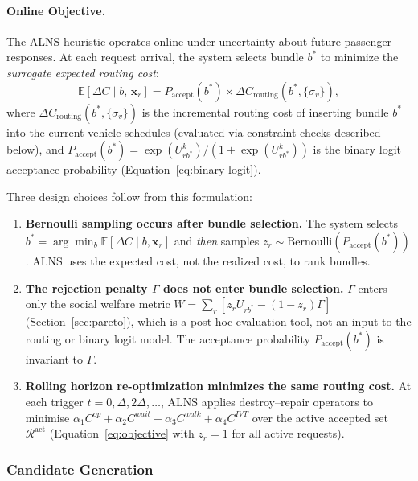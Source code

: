 \paragraph{Online Objective.}
The ALNS heuristic operates online under uncertainty about future passenger responses.
At each request arrival, the system selects bundle $b^*$ to minimize the
\emph{surrogate expected routing cost}:
\begin{equation}\label{eq:alns-objective}
  \mathbb{E}[\Delta C \mid b,\, \mathbf{x}_r]
    = P_{\text{accept}}(b^*) \times \Delta C_{\text{routing}}(b^*, \{\sigma_v\}),
\end{equation}
where $\Delta C_{\text{routing}}(b^*, \{\sigma_v\})$ is the incremental routing cost
of inserting bundle $b^*$ into the current vehicle schedules
(evaluated via constraint checks described below), and
$P_{\text{accept}}(b^*) = \exp(U_{rb^*}^k) / (1 + \exp(U_{rb^*}^k))$
is the binary logit acceptance probability (Equation~\ref{eq:binary-logit}).

Three design choices follow from this formulation:
\begin{enumerate}
  \item \textbf{Bernoulli sampling occurs after bundle selection.}
        The system selects $b^* = \arg\min_b \mathbb{E}[\Delta C \mid b, \mathbf{x}_r]$
        and \emph{then} samples $z_r \sim \mathrm{Bernoulli}(P_{\text{accept}}(b^*))$.
        ALNS uses the expected cost, not the realized cost, to rank bundles.
  \item \textbf{The rejection penalty $\Gamma$ does not enter bundle selection.}
        $\Gamma$ enters only the social welfare metric
        $W = \sum_r [z_r U_{rb^*} - (1-z_r)\Gamma]$ (Section~\ref{sec:pareto}),
        which is a post-hoc evaluation tool, not an input to the routing or
        binary logit model. The acceptance probability $P_{\text{accept}}(b^*)$
        is invariant to $\Gamma$.
  \item \textbf{Rolling horizon re-optimization minimizes the same routing cost.}
        At each trigger $t = 0, \Delta, 2\Delta, \ldots$, ALNS applies
        destroy--repair operators to minimise
        $\alpha_1 C^{op} + \alpha_2 C^{wait} + \alpha_3 C^{walk} + \alpha_4 C^{IVT}$
        over the active accepted set $\mathcal{R}^{\text{act}}$
        (Equation~\ref{eq:objective} with $z_r = 1$ for all active requests).
\end{enumerate}

\subsubsection{Candidate Generation}

